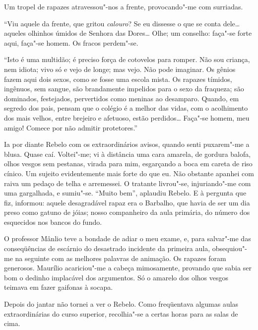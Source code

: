 
Um tropel de rapazes atravessou"-nos a
frente, provocando"-me com surriadas. 

``Viu aquele da frente, que
gritou \textit{calouro}? Se eu dissesse o que se conta dele\ldots{} aqueles olhinhos
úmidos de Senhora das Dores\ldots{} Olhe; um conselho: faça"-se forte aqui,
faça"-se homem. Os fracos perdem"-se. 

``Isto é uma multidão; é preciso
força de cotovelos para romper. Não sou criança, nem idiota; vivo só e
vejo de longe; mas vejo. Não pode imaginar. Os gênios fazem aqui dois
sexos, como se fosse uma escola mista. Os rapazes tímidos, ingênuos,
sem sangue, são brandamente impelidos para o sexo da fraqueza; são
dominados, festejados, pervertidos como meninas ao desamparo. Quando,
em segredo dos pais, pensam que o colégio é a melhor das vidas, com o
acolhimento dos mais velhos, entre brejeiro e afetuoso, estão
perdidos\ldots{} Faça"-se homem, meu amigo! Comece por não admitir
protetores.'' 

Ia por diante Rebelo com os extraordinários avisos, quando
senti puxarem"-me a blusa. Quase caí. Voltei"-me; vi à distância uma
cara amarela, de gordura balofa, olhos vesgos sem pestanas, virada para
mim, esgarçando a boca em careta de riso cínico. Um sujeito
evidentemente mais forte do que eu. Não obstante apanhei com raiva um
pedaço de telha e arremessei. O tratante livrou"-se, injuriando"-me
com uma gargalhada, e sumiu"-se. ``Muito bem'', aplaudiu Rebelo. E à
pergunta que fiz, informou: aquele desagradável rapaz era o Barbalho,
que havia de ser um dia preso como gatuno de jóias; nosso companheiro
da aula primária, do número dos esquecidos nos bancos do fundo. 


O professor Mânlio teve a bondade de adiar o meu exame, e, para
salvar"-me das conseqüências de escárnio do desastrado incidente da
primeira aula, obsequiou"-me na seguinte com as melhores palavras de
animação. Os rapazes foram generosos. Maurílio acariciou"-me a cabeça
mimosamente, provando que sabia ser bom o dedinho implacável dos
argumentos. Só o amarelo dos olhos vesgos teimava em fazer gaifonas à
socapa. 

Depois do jantar não tornei a ver o Rebelo. Como freqüentava
algumas aulas extraordinárias do curso superior, recolhia"-se a certas
horas para as salas de cima. 


